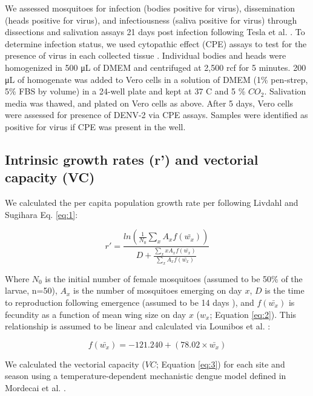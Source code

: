 \documentclass{bmcart}
\begin{document}
We assessed mosquitoes for infection (bodies positive for virus), dissemination (heads positive for virus), and infectiousness (saliva positive for virus) through dissections and salivation assays 21 days post infection following Tesla et al. \citep{tesla2017}.
To determine infection status, we used cytopathic effect (CPE) assays to test for the presence of virus in each collected tissue \citep{balaya1969}.
Individual bodies and heads were homogenized in 500 \si{\micro\liter} of DMEM and centrifuged at 2,500 rcf for 5 minutes. 200 \si{\micro\liter} of homogenate was added to Vero cells in a solution of DMEM (1\% pen-strep, 5\% FBS by volume) in a 24-well plate and kept at 37 \degree C and 5 \% ${CO_2}$.
Salivation media was thawed, and plated on Vero cells as above.
After 5 days, Vero cells were assessed for presence of DENV-2 via CPE assays.
Samples were identified as positive for virus if CPE was present in the well.

\subsection*{Intrinsic growth rates (r') and vectorial capacity (VC)}

We calculated the per capita population growth rate per following Livdahl and Sugihara \citep{livdahl1984} {Eq. \ref{eq:1}}:

\begin{equation} \label{eq:1}
r' = \frac{ln(\frac{1}{N_0}\sum_{x}^{ }{A_x}f(\bar{w_x}))}{D+\frac{\sum_{x}^{ }xA_xf(\bar{w_x})}{\sum_{x}^{ }A_xf(\bar{w_x})}}
\end{equation}

Where $N_0$ is the initial number of female mosquitoes (assumed to be 50\% of the larvae, n=50), $A_x$ is the number of mosquitoes emerging on day $x$, $D$ is the time to reproduction following emergence (assumed to be 14 days \citep{livdahl1991}), and $f(\bar{w_x})$ is fecundity as a function of mean wing size on day $x$ ($w_x$; Equation \ref{eq:2}).
This relationship is assumed to be linear and calculated via Lounibos et al. \citep{lounibos2002}:

\begin{equation} \label{eq:2}
f(\bar{w_x}) = -121.240 + (78.02 \times \bar{w_x})
\end{equation}

We calculated the vectorial capacity ($VC$; Equation \ref{eq:3}) for each site and season using a temperature-dependent mechanistic dengue model defined in Mordecai et al. \citep{mordecai2017}.
\end{document}
